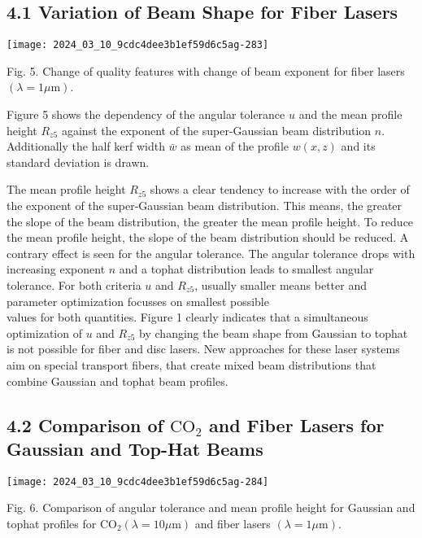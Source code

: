 \documentclass[10pt]{article}
\begin{document}
\subsection*{4.1 Variation of Beam Shape for Fiber Lasers}
\begin{center}
\texttt{[image: 2024\_03\_10\_9cdc4dee3b1ef59d6c5ag-283]}
\end{center}

Fig. 5. Change of quality features with change of beam exponent for fiber lasers $(\lambda=1 \mu \mathrm{m})$.

Figure 5 shows the dependency of the angular tolerance $u$ and the mean profile height $R_{z 5}$ against the exponent of the super-Gaussian beam distribution $n$. Additionally the half kerf width $\bar{w}$ as mean of the profile $w(x, z)$ and its standard deviation is drawn.

The mean profile height $R_{z 5}$ shows a clear tendency to increase with the order of the exponent of the super-Gaussian beam distribution. This means, the greater the slope of the beam distribution, the greater the mean profile height. To reduce the mean profile height, the slope of the beam distribution should be reduced. A contrary effect is seen for the angular tolerance. The angular tolerance drops with increasing exponent $n$ and a tophat distribution leads to smallest angular tolerance. For both criteria $u$ and $R_{z 5}$, usually smaller means better and parameter optimization focusses on smallest possible\\
values for both quantities. Figure 1 clearly indicates that a simultaneous optimization of $u$ and $R_{z 5}$ by changing the beam shape from Gaussian to tophat is not possible for fiber and disc lasers. New approaches for these laser systems aim on special transport fibers, that create mixed beam distributions that combine Gaussian and tophat beam profiles.

\subsection*{4.2 Comparison of $\mathrm{CO}_{2}$ and Fiber Lasers for Gaussian and Top-Hat Beams}
\begin{center}
\texttt{[image: 2024\_03\_10\_9cdc4dee3b1ef59d6c5ag-284]}
\end{center}

Fig. 6. Comparison of angular tolerance and mean profile height for Gaussian and tophat profiles for $\mathrm{CO}_{2}(\lambda=10 \mu \mathrm{m})$ and fiber lasers $(\lambda=1 \mu \mathrm{m})$.
\end{document}
